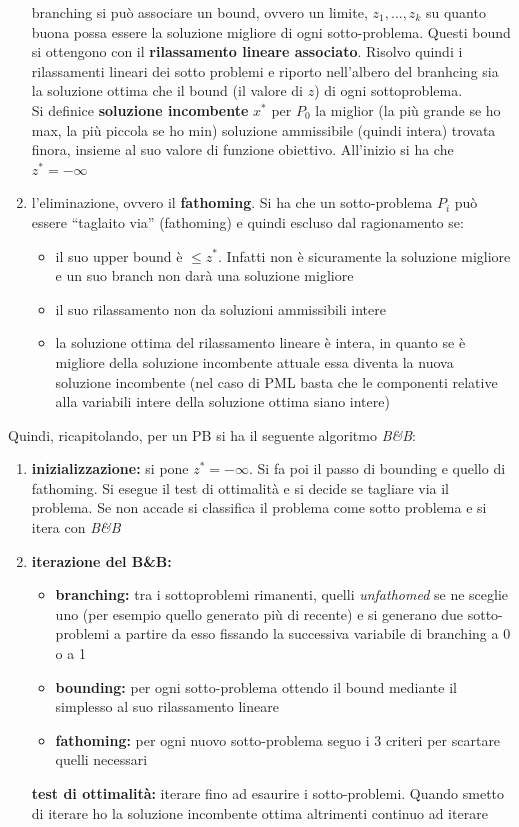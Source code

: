 \message{ !name(ro.tex)}\documentclass[a4paper,12pt, oneside]{book}
\begin{document}
\begin{enumerate}
  branching si può associare un bound, ovvero un limite,
  $z_1,\ldots,z_k$ su quanto buona possa essere la soluzione migliore
  di ogni sotto-problema. Questi bound si ottengono con il
  \textbf{rilassamento lineare associato}. Risolvo quindi i
  rilassamenti lineari dei sotto problemi e riporto nell'albero del
  branhcing sia la soluzione ottima che il bound (il valore di $z$) di
  ogni sottoproblema.\\
  Si definice \textbf{soluzione incombente} $x^*$ per $P_0$ la miglior (la
  più grande se ho max, la più piccola se ho min)   soluzione
  ammissibile (quindi intera) trovata finora, insieme al suo valore
  di funzione obiettivo. All'inizio si ha che $z^*=-\infty$
  \item l'eliminazione, ovvero il \textbf{fathoming}. Si ha che un
  sotto-problema $P_i$ può essere ``taglaito via'' (fathoming) e
  quindi escluso dal ragionamento se:
  \begin{itemize}
    \item il suo upper bound è $\leq z^*$. Infatti non è sicuramente
    la soluzione migliore e un suo branch non darà una soluzione
    migliore
    \item il suo rilassamento non da soluzioni ammissibili intere
    \item la soluzione ottima del rilassamento lineare è intera, in
    quanto se è migliore della soluzione incombente attuale essa
    diventa la nuova soluzione incombente (nel caso di PML basta che
    le componenti relative alla variabili intere della soluzione
    ottima siano intere)
  \end{itemize}
\end{enumerate}
Quindi, ricapitolando, per un PB si ha il seguente algoritmo
\textit{B\&B}:
\begin{shaded}
  \begin{enumerate}
    \item \textbf{inizializzazione:} si pone $z^*=-\infty$. Si fa poi
    il passo di bounding e quello di fathoming. Si esegue il test di
    ottimalità e si decide se tagliare via il problema. Se non accade
    si classifica il problema come sotto problema e si itera con
    \textit{B\&B}
    \item \textbf{iterazione del B\&B:}
    \begin{itemize}
      \item \textbf{branching:} tra i sottoproblemi rimanenti, quelli
      \textit{unfathomed} se ne sceglie uno (per esempio quello
      generato più di recente) e si generano due sotto-problemi a
      partire da esso fissando la successiva variabile di branching a
      0 o a 1
      \item \textbf{bounding:} per ogni sotto-problema ottendo il
      bound mediante il simplesso al suo rilassamento lineare
      \item \textbf{fathoming:} per ogni nuovo sotto-problema seguo i
      3 criteri per scartare quelli necessari
    \end{itemize}
    \textbf{test di ottimalità:} iterare fino ad esaurire i
    sotto-problemi. Quando smetto di iterare ho la soluzione
    incombente ottima altrimenti continuo ad iterare
  \end{enumerate}
\end{shaded}
\end{document}
